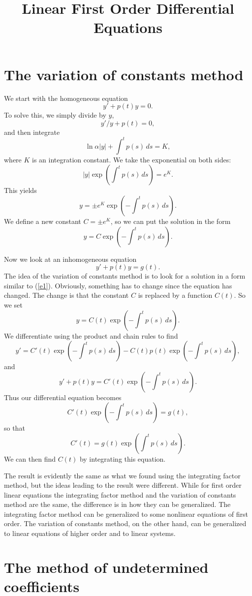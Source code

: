 
\title{Linear First Order Differential Equations}
\maketitle
\section{The variation of constants method}

We start with the homogeneous equation
$$y'+p(t)y=0.$$
To solve this, we simply divide by $y$,
$$y'/y+p(t)=0,$$
and then integrate
$$\ln\alpha|y|+\int^t p(s)\,ds=K,$$
where $K$ is an integration constant.
We take the exponential on both sides:
$$|y|\exp(\int^t p(s)\,ds)=e^K.$$
This yields
$$y=\pm e^K\exp(-\int^t p(s)\,ds).$$
We define a new constant $C=\pm e^K$, so we can put the solution in the
form
\begin{equation}
y=C\exp(-\int^t p(s)\,ds).\label{e1}
\end{equation}

Now we look at an inhomogeneous equation
\begin{equation}
y'+p(t)y=g(t).\label{e2}
\end{equation}
The idea of the variation of constants method is to look for a solution in
a form similar to (\ref{e1}). Obviously, something has to change since the
equation has changed. The change is that the constant $C$ is replaced by
a function $C(t)$. So we set
$$y=C(t)\exp(-\int^t p(s)\,ds).$$
We differentiate using the product and chain rules to find
$$y'=C'(t)\exp(-\int^t p(s)\,ds)-C(t)p(t)\exp(-\int^t p(s)\,ds),$$
and
$$y'+p(t)y=C'(t)\exp(-\int^t p(s)\,ds).$$
Thus our differential equation becomes
$$C'(t)\exp(-\int^t p(s)\,ds)=g(t),$$
so that
$$C'(t)=g(t)\exp(\int^t p(s)\,ds).$$
We can then find $C(t)$ by integrating this equation.

The result is evidently the same as what we found using the integrating factor
method, but the ideas leading to the result were different. While for first
order linear equations the integrating factor method and the variation
of constants method are the same, the difference is in how they can be
generalized. The integrating factor method can be generalized to some nonlinear
equations of first order. The variation of constants method, on the other
hand, can be generalized to linear equations of higher order and to linear
systems.

\section{The method of undetermined coefficients}

